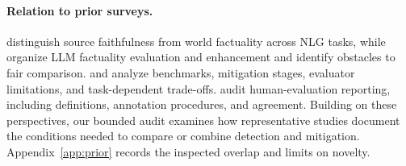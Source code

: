 \paragraph{Relation to prior surveys.}
\citet{Ji_2023} distinguish source faithfulness from world factuality across NLG tasks, while \citet{wang-etal-2024-factuality} organize LLM factuality evaluation and enhancement and identify obstacles to fair comparison. \citet{zhang-etal-2025-sirens} and \citet{Alansari_2026} analyze benchmarks, mitigation stages, evaluator limitations, and task-dependent trade-offs. \citet{schmidtova-etal-2025-eyes} audit human-evaluation reporting, including definitions, annotation procedures, and agreement. Building on these perspectives, our bounded audit examines how representative studies document the conditions needed to compare or combine detection and mitigation. Appendix~\ref{app:prior} records the inspected overlap and limits on novelty.
